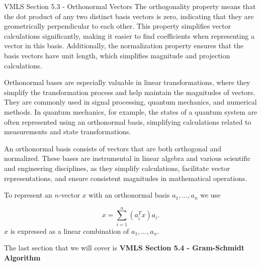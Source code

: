 \begin{notes}{VMLS Section 5.3 - Orthonormal Vectors}
    The orthogonality property means that the dot product of any two distinct basis vectors is zero, indicating that they are geometrically perpendicular to each other. This property simplifies vector 
    calculations significantly, making it easier to find coefficients when representing a vector in this basis. Additionally, the normalization property ensures that the basis vectors have unit length, 
    which simplifies magnitude and projection calculations.
    
    Orthonormal bases are especially valuable in linear transformations, where they simplify the transformation process and help maintain the magnitudes of vectors. They are commonly used in signal 
    processing, quantum mechanics, and numerical methods. In quantum mechanics, for example, the states of a quantum system are often represented using an orthonormal basis, simplifying calculations 
    related to measurements and state transformations.
    
    An orthonormal basis consists of vectors that are both orthogonal and normalized. These bases are instrumental in linear algebra and various scientific and engineering disciplines, as they simplify 
    calculations, facilitate vector representations, and ensure consistent magnitudes in mathematical operations.

    \begin{Highlight}
        To represent an $n$-vector $x$ with an orthonormal basis $a_{1}, \dots, a_{n}$ we use

        \begin{equation*}
            x = \sum_{i = 1}^{n} (a_{i}^{T}x)a_{i}.
        \end{equation*}
        $x$ is expressed as a linear combination of $a_{1}, \dots, a_{n}$.
    \end{Highlight}
\end{notes}

The last section that we will cover is \textbf{VMLS Section 5.4 - Gram-Schmidt Algorithm}

